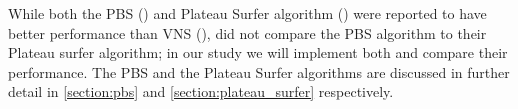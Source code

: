 While both the PBS (\cite{pullan_memetic_2008}) and Plateau Surfer algorithm (\cite{battiti_new_2017}) were reported to have better performance than VNS (\cite{mladenovic_solving_2003}), \textcite{battiti_new_2017} did not compare the PBS algorithm to their Plateau surfer algorithm; in our study we will implement both and compare their performance. The PBS and the Plateau Surfer algorithms are discussed in further detail in \cref{section:pbs} and \cref{section:plateau_surfer} respectively.